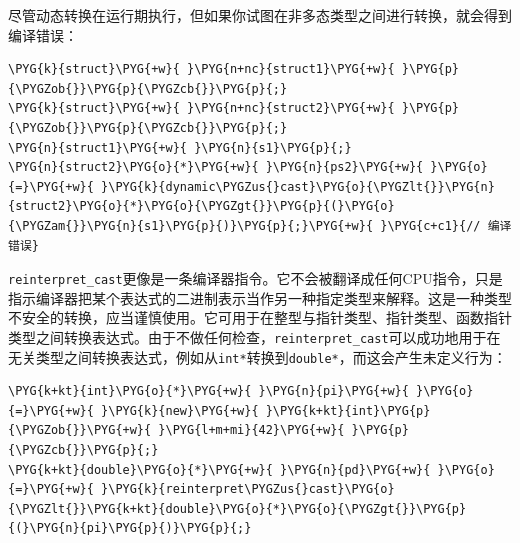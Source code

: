 
尽管动态转换在运行期执行，但如果你试图在非多态类型之间进行转换，就会得到编译错误：



\begin{codeblockbg}
\begin{Verbatim}[commandchars=\\\{\},breaklines=true,breakanywhere=true,fontsize=\codefont,xleftmargin=17bp]
\PYG{k}{struct}\PYG{+w}{ }\PYG{n+nc}{struct1}\PYG{+w}{ }\PYG{p}{\PYGZob{}}\PYG{p}{\PYGZcb{}}\PYG{p}{;}
\PYG{k}{struct}\PYG{+w}{ }\PYG{n+nc}{struct2}\PYG{+w}{ }\PYG{p}{\PYGZob{}}\PYG{p}{\PYGZcb{}}\PYG{p}{;}
\PYG{n}{struct1}\PYG{+w}{ }\PYG{n}{s1}\PYG{p}{;}
\PYG{n}{struct2}\PYG{o}{*}\PYG{+w}{ }\PYG{n}{ps2}\PYG{+w}{ }\PYG{o}{=}\PYG{+w}{ }\PYG{k}{dynamic\PYGZus{}cast}\PYG{o}{\PYGZlt{}}\PYG{n}{struct2}\PYG{o}{*}\PYG{o}{\PYGZgt{}}\PYG{p}{(}\PYG{o}{\PYGZam{}}\PYG{n}{s1}\PYG{p}{)}\PYG{p}{;}\PYG{+w}{ }\PYG{c+c1}{// 编译错误}
\end{Verbatim}
\end{codeblockbg}



\texttt{reinterpret\_\allowbreak{}cast}更像是一条编译器指令。它不会被翻译成任何CPU指令，只是指示编译器把某个表达式的二进制表示当作另一种指定类型来解释。这是一种类型不安全的转换，应当谨慎使用。它可用于在整型与指针类型、指针类型、函数指针类型之间转换表达式。由于不做任何检查，\texttt{reinterpret\_\allowbreak{}cast}可以成功地用于在无关类型之间转换表达式，例如从\texttt{int*}转换到\texttt{double*}，而这会产生未定义行为：



\begin{codeblockbg}
\begin{Verbatim}[commandchars=\\\{\},breaklines=true,breakanywhere=true,fontsize=\codefont,xleftmargin=17bp]
\PYG{k+kt}{int}\PYG{o}{*}\PYG{+w}{ }\PYG{n}{pi}\PYG{+w}{ }\PYG{o}{=}\PYG{+w}{ }\PYG{k}{new}\PYG{+w}{ }\PYG{k+kt}{int}\PYG{p}{\PYGZob{}}\PYG{+w}{ }\PYG{l+m+mi}{42}\PYG{+w}{ }\PYG{p}{\PYGZcb{}}\PYG{p}{;}
\PYG{k+kt}{double}\PYG{o}{*}\PYG{+w}{ }\PYG{n}{pd}\PYG{+w}{ }\PYG{o}{=}\PYG{+w}{ }\PYG{k}{reinterpret\PYGZus{}cast}\PYG{o}{\PYGZlt{}}\PYG{k+kt}{double}\PYG{o}{*}\PYG{o}{\PYGZgt{}}\PYG{p}{(}\PYG{n}{pi}\PYG{p}{)}\PYG{p}{;}
\end{Verbatim}
\end{codeblockbg}



